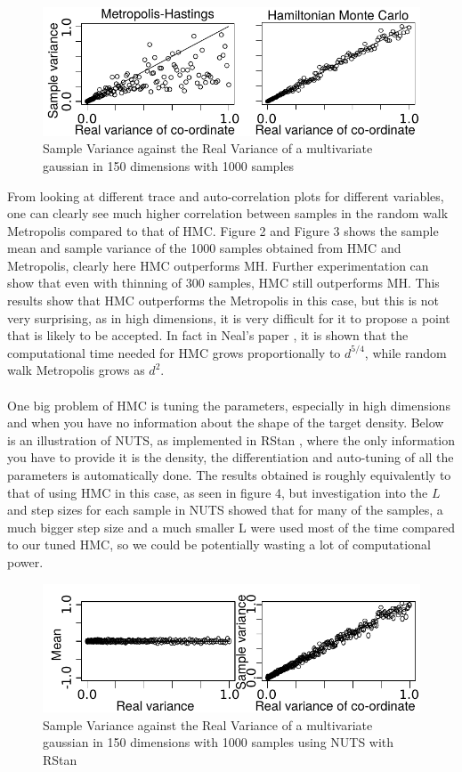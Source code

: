 \documentclass[11pt]{article}
\begin{document}
\begin{figure}[H]
\center
  \includegraphics[width=5in]{images/MHvsHM_varcoord.pdf}
  \caption{Sample Variance against the Real Variance of a multivariate gaussian in 150 dimensions with 1000 samples}
\end{figure}
\noindent From looking at different trace and auto-correlation plots for different variables, one can clearly see much higher correlation between samples in the random walk Metropolis compared to that of HMC. Figure 2 and Figure 3 shows the sample mean and sample variance of the 1000 samples obtained from HMC and Metropolis, clearly here HMC outperforms MH. Further experimentation can show that even with thinning of 300 samples, HMC still outperforms MH. This results show that HMC outperforms the Metropolis in this case, but this is not very surprising, as in high dimensions, it is very difficult for it to propose a point that is likely to be accepted. In fact in Neal's paper \cite{neal}, it is shown that the computational time needed for HMC grows proportionally to $d^{5/4}$, while random walk Metropolis grows as $d^{2}$. 
\\
\\
One big problem of HMC is tuning the parameters, especially in high dimensions and when you have no information about the shape of the target density. Below is an illustration of NUTS, as implemented in RStan \cite{rstan}, where the only information you have to provide it is the density, the differentiation and auto-tuning of all the parameters is automatically done. The results obtained is roughly equivalently to that of using HMC in this case, as seen in figure 4, but investigation into the $L$ and step sizes for each sample in NUTS showed that for many of the samples, a much bigger step size and a much smaller L were used most of the time compared to our tuned HMC, so we could be potentially wasting a lot of computational power.
\begin{figure}[H]
\center
  \includegraphics[width=5in]{images/NUTS_comparisons.pdf}
  \caption{Sample Variance against the Real Variance of a multivariate gaussian in 150 dimensions with 1000 samples using NUTS with RStan}
\end{figure}
\end{document}
